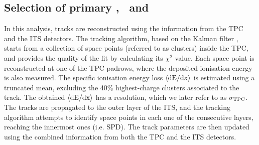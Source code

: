 \documentclass[ALICE,manyauthors]{cernphprep}
\begin{document}


\subsection{Selection of primary \pion, \kaon~and \proton}
\label{SubSec:Track}
In this analysis, tracks are reconstructed using the information from the TPC and the ITS detectors. The tracking algorithm, based on the Kalman filter \cite{Billoir:1983mz,Billoir:1985nq}, starts from a collection of space points (referred to as clusters) inside the TPC, and provides the quality of the fit by calculating its $\chi^{2}$ value. Each space point is reconstructed at one of the TPC padrows, where the deposited ionisation energy is also measured. The specific ionisation energy loss $\langle{\rm{dE}/dx}\rangle$ is estimated using a truncated mean, excluding the 40\% highest-charge clusters associated to the track. The obtained $\langle{\rm{dE}/dx}\rangle$ has a resolution, which we later refer to as $\sigma_{\rm{TPC}}$. The tracks are propagated to the outer layer of the ITS, and the tracking algorithm attempts to identify space points in each one of the consecutive layers, reaching the innermost ones (i.e. SPD). The track parameters are then updated using the combined information from both the TPC and the ITS detectors. 
\end{document}
